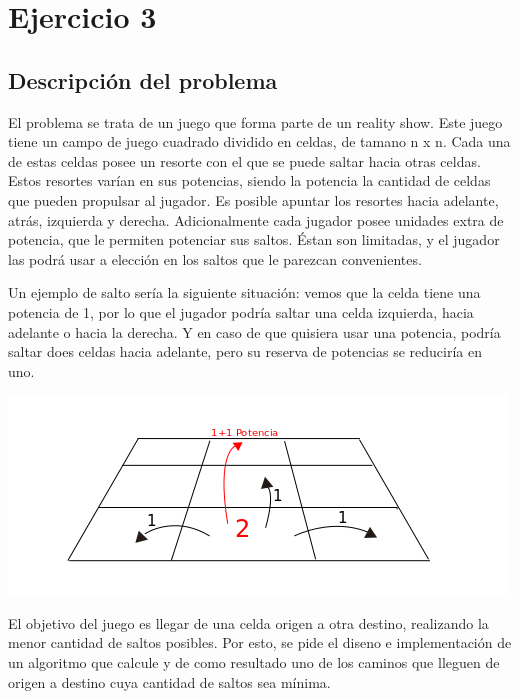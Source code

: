 \section{Ejercicio 3}

\subsection{Descripci\'on del problema} \label{ej_3:descripcion}

El problema se trata de un juego que forma parte de un reality show. Este juego tiene un campo de juego cuadrado dividido en celdas, de tamano n x n. Cada una de estas celdas posee un resorte con el que se puede saltar hacia otras celdas. Estos resortes var\'ian en sus potencias, siendo la potencia la cantidad de celdas que pueden propulsar al jugador. Es posible apuntar los resortes hacia adelante, atr\'as, izquierda y derecha. Adicionalmente cada jugador posee unidades extra de potencia, que le permiten potenciar sus saltos.  \'Estan son limitadas, y el jugador las podr\'a usar a elecci\'on en los saltos que le parezcan convenientes.

\vspace{2mm}

Un ejemplo de salto ser\'ia la siguiente situaci\'on: vemos que la celda tiene una potencia de 1, por lo que el jugador podr\'ia saltar una celda izquierda, hacia adelante o hacia la derecha. Y en caso de que quisiera usar una potencia, podr\'ia saltar does celdas hacia adelante, pero su reserva de potencias se reducir\'ia en uno.
 \vspace{2mm}
\begin{center}
\includegraphics[scale=0.9]{images/saltos}
\end{center}
El objetivo del juego es llegar de una celda origen a otra destino, realizando la menor cantidad de saltos posibles. Por esto, se pide el diseno e implementaci\'on de un algoritmo que calcule y de como resultado uno de los caminos que lleguen de origen a destino cuya cantidad de saltos sea m\'inima.
\vspace{2mm}


